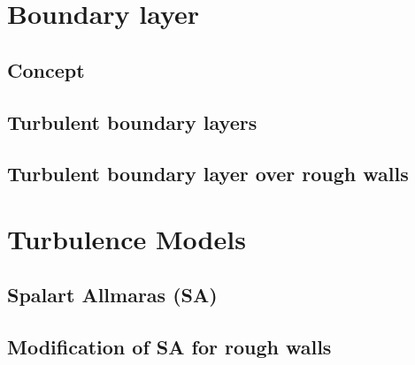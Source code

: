 \section{Boundary layer}

\subsection{Concept}


\subsection{Turbulent boundary layers}


\subsection{Turbulent boundary layer over rough walls}


\section{Turbulence Models}


\subsection{Spalart Allmaras (SA)}


\subsection{Modification of SA for rough walls}
